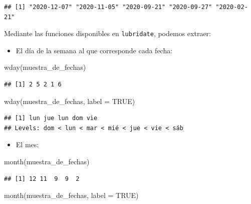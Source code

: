 \documentclass[
]{book}
\newenvironment{Shaded}{\begin{snugshade}}{\end{snugshade}}
\newcommand{\AttributeTok}[1]{\textcolor[rgb]{0.77,0.63,0.00}{#1}}
\newcommand{\ConstantTok}[1]{\textcolor[rgb]{0.00,0.00,0.00}{#1}}
\newcommand{\FunctionTok}[1]{\textcolor[rgb]{0.00,0.00,0.00}{#1}}
\newcommand{\NormalTok}[1]{#1}
\providecommand{\tightlist}{%
  \setlength{\itemsep}{0pt}\setlength{\parskip}{0pt}}
\begin{document}
\begin{verbatim}
## [1] "2020-12-07" "2020-11-05" "2020-09-21" "2020-09-27" "2020-02-21"
\end{verbatim}

Mediante las funciones disponibles en \texttt{lubridate}, podemos extraer:

\begin{itemize}
\tightlist
\item
  El día de la semana al que corresponde cada fecha:
\end{itemize}

\begin{Shaded}
\begin{Highlighting}[]
\FunctionTok{wday}\NormalTok{(muestra\_de\_fechas)}
\end{Highlighting}
\end{Shaded}

\begin{verbatim}
## [1] 2 5 2 1 6
\end{verbatim}

\begin{Shaded}
\begin{Highlighting}[]
\FunctionTok{wday}\NormalTok{(muestra\_de\_fechas, }\AttributeTok{label =} \ConstantTok{TRUE}\NormalTok{)}
\end{Highlighting}
\end{Shaded}

\begin{verbatim}
## [1] lun jue lun dom vie
## Levels: dom < lun < mar < mié < jue < vie < sáb
\end{verbatim}

\begin{itemize}
\tightlist
\item
  El mes:
\end{itemize}

\begin{Shaded}
\begin{Highlighting}[]
\FunctionTok{month}\NormalTok{(muestra\_de\_fechas)}
\end{Highlighting}
\end{Shaded}

\begin{verbatim}
## [1] 12 11  9  9  2
\end{verbatim}

\begin{Shaded}
\begin{Highlighting}[]
\FunctionTok{month}\NormalTok{(muestra\_de\_fechas, }\AttributeTok{label =} \ConstantTok{TRUE}\NormalTok{)}
\end{Highlighting}
\end{Shaded}
\end{document}
